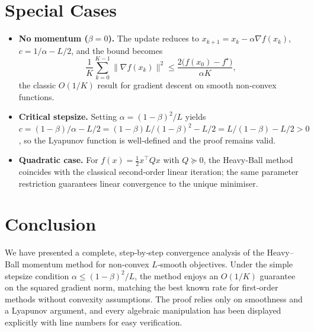\documentclass{article}
\newcommand{\grad}{\nabla}
\begin{document}
\section*{Special Cases}
\begin{itemize}
\item \textbf{No momentum ($\beta=0$).}  The update reduces to $x_{k+1}=x_k-\alpha\grad f(x_k)$, $c=1/\alpha-L/2$, and the bound becomes
\[
\frac{1}{K}\sum_{k=0}^{K-1}\|\grad f(x_k)\|^2\le\frac{2\bigl(f(x_0)-f^\star\bigr)}{\alpha K},
\]
the classic $O(1/K)$ result for gradient descent on smooth non‑convex functions.

\item \textbf{Critical stepsize.}  Setting $\alpha=(1-\beta)^2/L$ yields $c= (1-\beta)/\alpha -L/2 = (1-\beta)L/(1-\beta)^2 - L/2 = L/(1-\beta)-L/2>0$, so the Lyapunov function is well‑defined and the proof remains valid.

\item \textbf{Quadratic case.}  For $f(x)=\frac{1}{2}x^\top Qx$ with $Q\succeq0$, the Heavy‑Ball method coincides with the classical second‑order linear iteration; the same parameter restriction guarantees linear convergence to the unique minimiser.
\end{itemize}

\section*{Conclusion}
We have presented a complete, step‑by‑step convergence analysis of the Heavy–Ball momentum method for non‑convex $L$‑smooth objectives. Under the simple stepsize condition $\alpha\le(1-\beta)^2/L$, the method enjoys an $O(1/K)$ guarantee on the squared gradient norm, matching the best known rate for first‑order methods without convexity assumptions. The proof relies only on smoothness and a Lyapunov argument, and every algebraic manipulation has been displayed explicitly with line numbers for easy verification.
\end{document}
